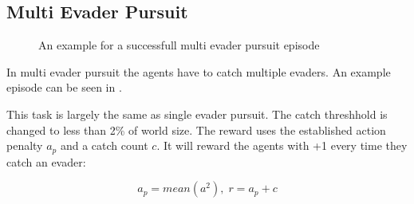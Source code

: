 \subsection{Multi Evader Pursuit}
\begin{figure}[htp]
    \centering
    \hspace{1cm}                       
    \caption{An example for a successfull multi evader pursuit episode}
    \label{fig:multi_evader_example}
\end{figure}

In multi evader pursuit the agents have to catch multiple evaders. An example episode can be seen in .\par

This task is largely the same as single evader pursuit. The catch threshhold is changed to less than 2\% of world size.
The reward uses the established action penalty $a_p$ and a catch count $c$. It will reward the agents with +1 every time they catch an evader:

\begin{equation} 
    a_p = mean(a^2),\; r = a_p + c  \nonumber
\end{equation}